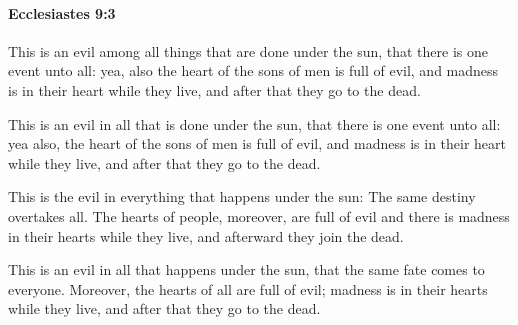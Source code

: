		\paragraph{Ecclesiastes 9:3} %
			\label{ECCLESIASTES-9-3}

			This is an evil among all things that are done under the sun, that there is one event unto all: yea, also the heart of the sons of men is full of evil, and madness is in their heart while they live, and after that they go to the dead.

			\begin{versebox}
					\item[BHS] 
					\item[LXX] 
					\item[ASV] This is an evil in all that is done under the sun, that there is one event unto all: yea also, the heart of the sons of men is full of evil, and madness is in their heart while they live, and after that they go to the dead.
					\item[NIV] This is the evil in everything that happens under the sun: The same destiny overtakes all. The hearts of people, moreover, are full of evil and there is madness in their hearts while they live, and afterward they join the dead.
					\item[NRSV] This is an evil in all that happens under the sun, that the same fate comes to everyone. Moreover, the hearts of all are full of evil; madness is in their hearts while they live, and after that they go to the dead.
			\end{versebox}

